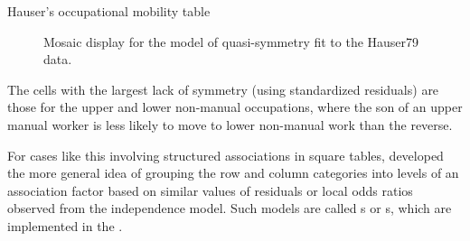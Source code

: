 \documentclass[11pt]{book}\usepackage[]{graphicx}\usepackage[]{color}
\newenvironment{knitrout}{}{} %
\renewenvironment{knitrout}{\small\renewcommand{\baselinestretch}{.85}}{} %
\begin{document}
\begin{Example}[hauser1]{Hauser's occupational mobility table}
\begin{knitrout}
\begin{figure}[!htbp]
\caption[Mosaic display  for the model of quasi-symmetry fit to the Hauser79 data]{Mosaic display  for the model of quasi-symmetry fit to the Hauser79 data.\label{fig:hauser-mosaic2}}
\end{figure}


\end{knitrout}
The cells with the largest lack of symmetry (using standardized residuals)
are those for the
upper and lower non-manual occupations, where the son of
an upper manual worker is less likely to move to lower non-manual
work than the reverse.

For cases like this involving structured associations in square tables,
\citet{Hauser:79} developed the more general idea of grouping
the row and column categories into levels of an association factor
based on similar values of residuals or local odds ratios observed from
the independence model.  Such models are called s
or s, which are implemented in the .


\end{Example}
\end{document}

